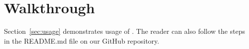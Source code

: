 \documentclass[sigconf,screen]{acmart}
\begin{document}
\balance



\appendix

\section{Walkthrough}

Section~\ref{sec:usage} demonstrates usage of \tname. The reader can
also follow the steps in the README.md file on our GitHub repository.
\end{document}
